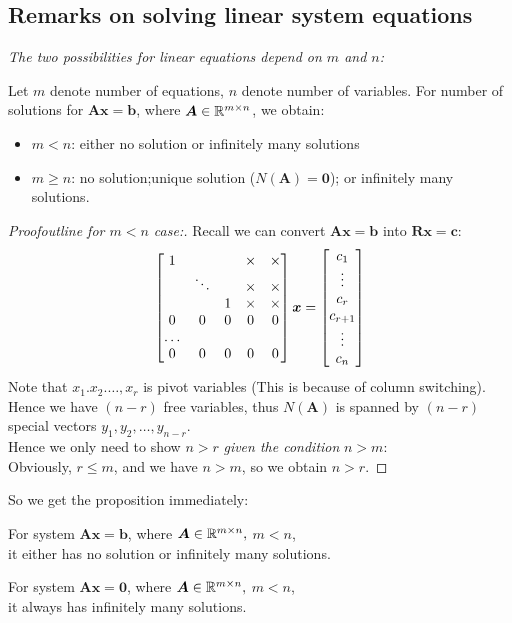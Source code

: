 \subsection{Remarks on solving linear system equations}
\emph{The two possibilities for linear equations depend on $m$ and $n$:}
\begin{theorem}
Let $m$ denote number of equations, $n$ denote number of variables. For number of solutions for $\bm{Ax} = \bm b$, where $\bm A\in\mathbb{R}^{m\times n}$, we obtain:
\begin{itemize}
\item
$m<n$: either no solution or infinitely many solutions
\item
$m\ge n$: no solution;unique solution ($N(\bm A) =\bm 0$); or infinitely many solutions.
\end{itemize}
\end{theorem}
\begin{proof}[Proofoutline for $m<n$ case:]
Recall we can convert $\bm{Ax} = \bm b$ into $\bm{Rx} = \bm{c}$:
\[
\begin{bmatrix}
1&&&\times&\times\\&\ddots&&\times&\times\\&&1&\times&\times\\0&0&0&0&0\\\dots&&&&\\0&0&0&0&0
\end{bmatrix}\bm x = \begin{bmatrix}
c_1\\\vdots\\c_r\\c_{r+1}\\\vdots\\c_n
\end{bmatrix}
\]
Note that $x_1.x_2.\dots,x_r$ is pivot variables (This is because of column switching). Hence we have $(n-r)$ free variables, thus $N(\bm A)$ is spanned by $(n-r)$ special vectors $y_1,y_2,\dots,y_{n-r}$.\\
Hence we only need to show $n>r$ \textit{given the condition} $n>m$:\\
Obviously, $r\le m$, and we have $n>m$, so we obtain $n>r$.
\end{proof}
So we get the proposition immediately:
\begin{proposition}
For system $\bm{Ax} = \bm b$, where $\bm A\in\mathbb{R}^{m\times n},$ $m<n$,\\
\hspace*{1cm}it either has no solution or infinitely many solutions.
\end{proposition}
\begin{corollary}\label{corollary_infinite_condition}
For system $\bm{Ax} = \bm 0$, where $\bm A\in\mathbb{R}^{m\times n},$ $m<n$,\\
\hspace*{1cm} it always has infinitely many solutions.
\end{corollary}
\newpage

